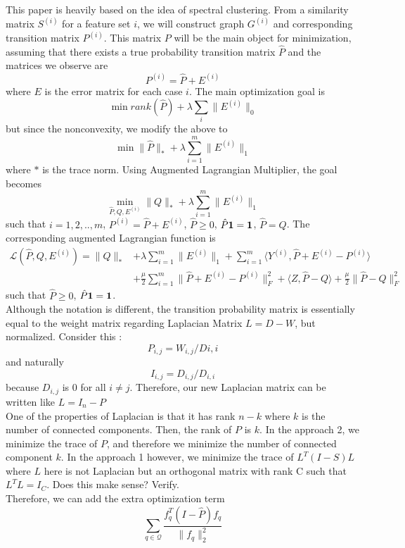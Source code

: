 \documentclass[11pt]{article}
\begin{document}
\noindent This paper is heavily based on the idea of spectral clustering. From a similarity matrix $S^{(i)}$ for a feature set $i$, we will construct graph $G^{(i)}$ and corresponding transition matrix $P^{(i)}$. This matrix $P$ will be the main object for minimization, assuming that there exists a true probability transition matrix $\hat{P}$ and the matrices we observe are
$$P^{(i)} = \hat{P} + E^{(i)}$$
where $E$ is the error matrix for each case $i$. The main optimization goal is
$$\min rank(\hat{P}) + \lambda \sum_i \|E^{(i)}\|_0$$
but since the nonconvexity, we modify the above to
$$\min \|\hat{P}\|_* + \lambda \sum_{i=1}^{m} \|E^{(i)}\|_1$$
where $*$ is the trace norm. Using Augmented Lagrangian Multiplier, the goal becomes
$$\min_{\hat{P}, Q, E^{(i)}} \|Q\|_* + \lambda \sum_{i=1}^{m} \|E^{(i)}\|_1$$
such that $i = 1, 2, .., m$, $P^{(i)} = \hat{P} + E^{(i)}$, $\hat{P}\geq 0$, $\hat{P} \bf{1} = \bf{1}$, $\hat{P} = Q$. 
The corresponding augmented Lagrangian function is
\begin{align}
\mathcal{L}(\hat{P},Q,E^{(i)}) = \|Q\|_* &+ \lambda \sum_{i=1}^{m} \|E^{(i)}\|_1 + \sum_{i=1}^{m} \langle Y^{(i)}, \hat{P} + E^{(i)}-P^{(i)} \rangle\\
&+ \frac{\mu}{2}\sum_{i=1}^{m} \| \hat{P} + E^{(i)} - P^{(i)}\|_F^2 + \langle Z, \hat{P}-Q \rangle + \frac{\mu}{2} \|\hat{P}-Q\|_F^2
\end{align}
such that $\hat{P}\geq 0$, $\hat{P} \bf{1} = \bf{1}$.\\

\noindent Although the notation is different, the transition probability matrix is essentially equal to the weight matrix regarding Laplacian Matrix $L = D-W$, but normalized. Consider this : $$P_{i,j} = W_{i,j} / D{i,i}$$ and naturally $$I_{i,j} = D_{i,j} / D_{i,i}$$ because $D_{i,j}$ is 0 for all $i \neq j$. Therefore, our new Laplacian matrix can be written like $L = I_n - P$\\

\noindent One of the properties of Laplacian is that it has rank $n-k$ where $k$ is the number of connected components. Then, the rank of $P$ is $k$. In the approach 2, we minimize the trace of $P$, and therefore we minimize the number of connected component $k$. In the approach 1 however, we minimize the trace of $L^T(I-S)L$ where $L$ here is not Laplacian but an orthogonal matrix with rank C such that $L^TL = I_C$. Does this make sense? Verify. \\

\noindent
Therefore, we can add the extra optimization term $$\sum_{q \in \mathcal{Q}} \frac{f_q^T (I-\hat{P}) f_q}{\|f_q\|_2^2}$$
\end{document}

